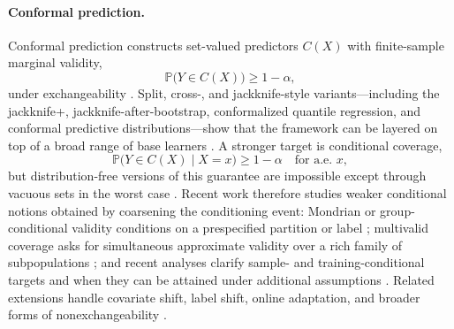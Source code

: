 \documentclass[11pt]{article}
\theoremstyle{statplain}
\theoremstyle{statdefinition}
\newcommand{\0}{\mathbf{0}}
\begin{document}
\paragraph{Conformal prediction.}
Conformal prediction constructs set-valued predictors $C(X)$ with finite-sample marginal validity,
\[
\mathbb{P}\Big(Y \in C(X)\Big) \ge 1-\alpha,
\]
under exchangeability \citep{vovk2005algorithmic,shafer2008tutorial}. Split, cross-, and jackknife-style variants---including the jackknife+, jackknife-after-bootstrap, conformalized quantile regression, and conformal predictive distributions---show that the framework can be layered on top of a broad range of base learners \citep{barber2021predictive,kim2020predictive,romano2019conformalized,vovk2015cross,vovk2018cross}. A stronger target is conditional coverage,
\[
\mathbb{P}\Big(Y \in C(X)\mid X=x\Big) \ge 1-\alpha \quad \text{for a.e. }x,
\]
but distribution-free versions of this guarantee are impossible except through vacuous sets in the worst case \citep{lei2014distribution,barber2021limits}. Recent work therefore studies weaker conditional notions obtained by coarsening the conditioning event: Mondrian or group-conditional validity conditions on a prespecified partition or label \citep{vovk2003mondrian,vovk2012conditional,martinezgil2024groups}; multivalid coverage asks for simultaneous approximate validity over a rich family of subpopulations \citep{jung2023multivalid,gibbs2025conformal}; and recent analyses clarify sample- and training-conditional targets and when they can be attained under additional assumptions \citep{duchi2025few,liang2025algorithmic}. Related extensions handle covariate shift, label shift, online adaptation, and broader forms of nonexchangeability \citep{tibshirani2019conformal,gibbs2021adaptive,podkopaev2021distribution,barber2022beyondexchangeability, berta2024classifier}.
\end{document}
